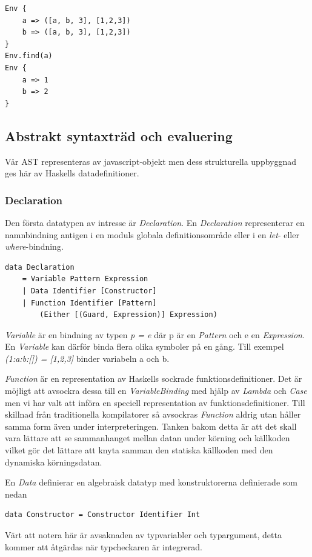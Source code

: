 \begin{lstlisting}
Env {
    a => ([a, b, 3], [1,2,3])
    b => ([a, b, 3], [1,2,3])
}
Env.find(a)
Env {
    a => 1
    b => 2
}
\end{lstlisting}

\subsection{Abstrakt syntaxträd och evaluering} 
Vår AST representeras av javascript-objekt men dess strukturella uppbyggnad ges här av Haskells datadefinitioner.

\subsubsection{Declaration}
Den första datatypen av intresse är \emph{Declaration}. En \emph{Declaration} representerar en namnbindning antigen i en moduls globala definitionsområde eller i en \emph{let}- eller \emph{where}-bindning.

\begin{lstlisting}
data Declaration 
    = Variable Pattern Expression
    | Data Identifier [Constructor]
    | Function Identifier [Pattern] 
        (Either [(Guard, Expression)] Expression)
\end{lstlisting}

\emph{Variable} är en bindning av typen \emph{p = e} där p är en \emph{Pattern} och e en \emph{Expression}. En \emph{Variable} kan därför binda flera olika symboler på en gång. Till exempel \emph{(1:a:b:[]) = [1,2,3]} binder variabeln a och b.

\emph{Function} är en representation av Haskells sockrade funktionsdefinitioner. Det är möjligt att avsockra dessa till en \emph{VariableBinding} med hjälp av \emph{Lambda} och \emph{Case} men vi har valt att införa en speciell representation av funktionsdefinitioner. Till skillnad från traditionella kompilatorer så avsockras \emph{Function} aldrig utan håller samma form även under interpreteringen. Tanken bakom detta är att det skall vara lättare att se sammanhanget mellan datan under körning och källkoden vilket gör det lättare att knyta samman den statiska källkoden med den dynamiska körningsdatan.

En \emph{Data} definierar en algebraisk datatyp med konstruktorerna definierade som nedan
\begin{lstlisting}
data Constructor = Constructor Identifier Int
\end{lstlisting}
Värt att notera här är avsaknaden av typvariabler och typargument, detta kommer att åtgärdas när typcheckaren är integrerad.

